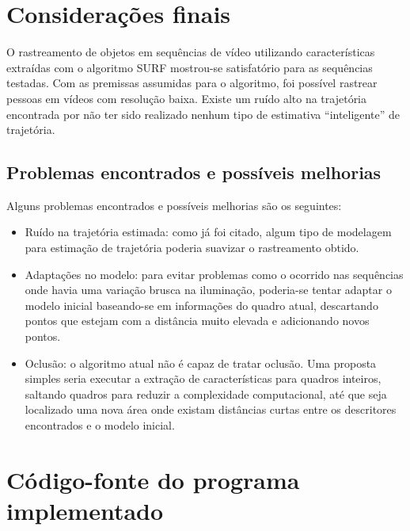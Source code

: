 \documentclass[a4paper]{coursepaper-br}
\begin{document}
\section{Considerações finais}
\label{sec:fin}

O rastreamento de objetos em sequências de vídeo utilizando
características extraídas com o algoritmo SURF mostrou-se satisfatório
para as sequências testadas. Com as premissas assumidas para o
algoritmo, foi possível rastrear pessoas em vídeos com resolução
baixa. Existe um ruído alto na trajetória encontrada por não ter sido
realizado nenhum tipo de estimativa ``inteligente'' de trajetória.

\subsection{Problemas encontrados e possíveis melhorias}

Alguns problemas encontrados e possíveis melhorias são os seguintes:

\begin{itemize}
 \item Ruído na trajetória estimada: como já foi citado, algum tipo de
   modelagem para estimação de trajetória poderia suavizar o
   rastreamento obtido.
 \item Adaptações no modelo: para evitar problemas como o ocorrido nas
   sequências onde havia uma variação brusca na iluminação, poderia-se
   tentar adaptar o modelo inicial baseando-se em informações do
   quadro atual, descartando pontos que estejam com a distância muito
   elevada e adicionando novos pontos.
 \item Oclusão: o algoritmo atual não é capaz de tratar oclusão. Uma
   proposta simples seria executar a extração de características para
   quadros inteiros, saltando quadros para reduzir a complexidade
   computacional, até que seja localizado uma nova área onde existam
   distâncias curtas entre os descritores encontrados e o modelo
   inicial.

\end{itemize}




\appendix

\section{Código-fonte do programa implementado}


\end{document}
